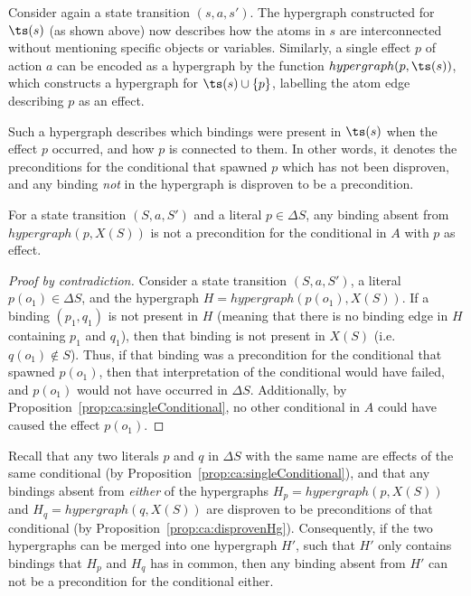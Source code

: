 \documentclass[\master/Master.tex]{subfiles}
\begin{document}
Consider again a state transition $\left( s, a, s' \right)$. The hypergraph constructed for $\ts(s)$ (as shown above) now describes how the atoms in $s$ are interconnected without mentioning specific objects or variables. Similarly, a single effect $p$ of action $a$ can be encoded as a hypergraph by the function $hypergraph(p,\ts(s))$, which constructs a hypergraph for $\ts(s) \cup \{p\}$, labelling the atom edge describing $p$ as an effect.

Such a hypergraph describes which bindings were present in $\ts(s)$ when the effect $p$ occurred, and how $p$ is connected to them. In other words, it denotes the preconditions for the conditional that spawned $p$ which has not been disproven, and any binding \textit{not} in the hypergraph is disproven to be a precondition.

\begin{proposition}\label{prop:ca:disprovenHg}
    For a state transition $\left( S, a, S' \right)$ and a literal $p \in \Delta S$, any binding absent from $hypergraph \left( p, X(S) \right)$ is not a precondition for the conditional in $A$ with $p$ as effect. 
\end{proposition}

\begin{proof}[Proof by contradiction]
    Consider a state transition $\left( S, a, S' \right)$, a literal $p \left( o_1 \right) \in \Delta S$, and the hypergraph $H = hypergraph\left( p\left(o_1\right), X(S) \right)$. If a binding $(p_1, q_1)$ is not present in $H$ (meaning that there is no binding edge in $H$ containing $p_1$ and $q_1$), then that binding is not present in $X(S)$ (i.e.\ $q\left(o_1\right) \notin S$). Thus, if that binding was a precondition for the conditional that spawned $p\left(o_1\right)$, then that interpretation of the conditional would have failed, and $p\left( o_1 \right)$ would not have occurred in $\Delta S$. Additionally, by Proposition~\ref{prop:ca:singleConditional}, no other conditional in $A$ could have caused the effect $p \left(o_1\right)$.
\end{proof}

Recall that any two literals $p$ and $q$ in $\Delta S$ with the same name are effects of the same conditional (by Proposition~\ref{prop:ca:singleConditional}), and that any bindings absent from \textit{either} of the hypergraphs $H_p = hypergraph(p, X(S))$ and $H_q = hypergraph(q, X(S))$ are disproven to be preconditions of that conditional (by Proposition~\ref{prop:ca:disprovenHg}). Consequently, if the two hypergraphs can be merged into one hypergraph $H'$, such that $H'$ only contains bindings that $H_p$ and $H_q$ has in common, then any binding absent from $H'$ can not be a precondition for the conditional either. 
\end{document}
